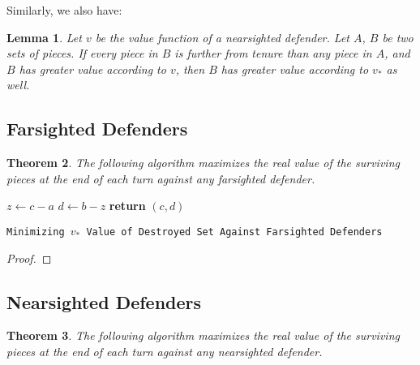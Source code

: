 \documentclass{article}
\theoremstyle{plain}
\newtheorem{thm}{Theorem}[section]
\newtheorem{lem}[thm]{Lemma}
\theoremstyle{definition}
\theoremstyle{remark}
\begin{document}
Similarly, we also have:

\begin{lem}
  Let $v$ be the value function of a nearsighted defender. Let $A$, $B$ be two sets of pieces. If every piece in $B$ is further from tenure than any piece in $A$, and $B$ has greater value according to $v$, then $B$ has greater value according to $v_{*}$ as well.
\end{lem}


\subsection{Farsighted Defenders}

\begin{thm}
  The following algorithm maximizes the real value of the surviving pieces at the end of each turn against any farsighted defender.
\end{thm}

\begin{center}
  \begin{minipage}{1\linewidth} %
    \begin{algorithm}[H]
      \medskip
      $z \leftarrow c - a$ \;
      $d \leftarrow b - z$ \;
      {\bf return} $(c,d)$ \;
      \caption{\texttt{Minimizing $v_{*}$ Value of Destroyed Set Against Farsighted Defenders}} %
      \label{alg:farsighted}   %
    \end{algorithm}
  \end{minipage}
\end{center}

\begin{proof}

\end{proof}

\newpage

\subsection{Nearsighted Defenders}

\begin{thm}
  The following algorithm maximizes the real value of the surviving pieces at the end of each turn against any nearsighted defender.
\end{thm}
\end{document}
